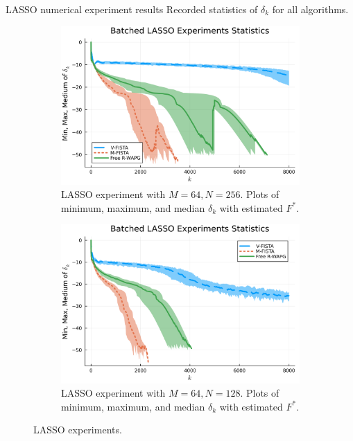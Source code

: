 \documentclass[11pt]{beamer}
\theoremstyle{definition}
\begin{document}
        \begin{frame}{LASSO numerical experiment results}
            Recorded statistics of $\delta_k$ for all algorithms. 
            \begin{figure}[H]
                \begin{subfigure}[b]{0.47\textwidth}
                    \centering
                    \includegraphics[width=\textwidth]{assets/lasso_batched_statistics_64-256.png}
                    \caption{LASSO experiment with $M = 64, N = 256$. Plots of minimum, maximum, and median $\delta_k$ with estimated $F^*$. }
                \end{subfigure}
                \hfill
                \begin{subfigure}[b]{0.47\textwidth}
                    \centering
                    \includegraphics[width=\textwidth]{assets/lasso_batched_statistics_64-128.png}
                    \caption{LASSO experiment with $M = 64, N = 128$. Plots of minimum, maximum, and median $\delta_k$ with estimated $F^*$. }
                \end{subfigure}
                \caption{LASSO experiments. }
                \label{fig:batched-lasso}
            \end{figure}
        \end{frame}
\end{document}
